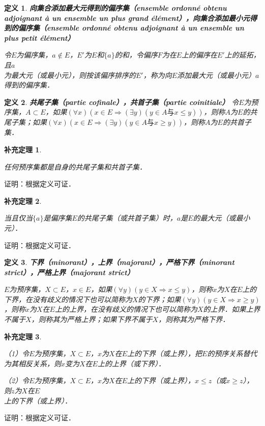 \documentclass[12pt, a4paper, oneside]{book}
\newtheorem{cor}{补充定理}
\newtheorem{de}{定义}
\begin{document}
			\begin{de}
				\textbf{向集合添加最大元得到的偏序集（ensemble ordonné obtenu adjoignant à un ensemble un plus grand élément），向集合添加最小元得到的偏序集（ensemble ordonné obtenu adjoignant à un ensemble un plus petit élément）}
				\hfill\par
				令$E$为偏序集，$a\notin E$，$E'$为$E$和$\{a\}$的和，令偏序$F$为在$E$上的偏序在$E'$上的延拓，且$a$\\为最大元（或最小元），则按该偏序排序的$E'$，称为向$E$添加最大元（或最小元）$a$得到的偏序集．
			\end{de}

			\begin{de}
				\textbf{共尾子集（partie cofinale），共首子集（partie coinitiale）}
				令$E$为预序集，$A\subset E$，如果$(\forall x)(x\in E\Rightarrow (\exists y)(y\in A\text{与}x\leq y))$，则称$A$为$E$的共尾子集；如果$(\forall x)(x\in E\Rightarrow (\exists y)(y\in A\text{与}x\geq y))$，则称$A$为$E$的共首子集．
			\end{de}

			\begin{cor}\label{cor174}
				\hfill\par
				任何预序集都是自身的共尾子集和共首子集．
			\end{cor}
			证明：根据定义可证．
			
			\begin{cor}\label{cor175}
				\hfill\par
				当且仅当$\{a\}$是偏序集$E$的共尾子集（或共首子集）时，$a$是$E$的最大元（或最小元）．
			\end{cor}
			证明：根据定义可证．

			\begin{de}
				\textbf{下界（minorant），上界（majorant），严格下界（minorant strict），严格上界（majorant strict）}
				\par
				$E$为预序集，$X\subset E$，$x\in E$，如果$(\forall y)(y\in X\Rightarrow x\leq y)$，则称$x$为$X$在$E$上的下界，在没有歧义的情况下也可以简称为$X$的下界；如果$(\forall y)(y\in X\Rightarrow x\geq y)$，则称$x$为$X$在$E$上的上界，在没有歧义的情况下也可以简称为$X$的上界．如果上界不属于$X$，则称其为严格上界；如果下界不属于$X$，则称其为严格下界．			
			\end{de}
			
			\begin{cor}\label{cor176}
				\hfill\par
				（1）令$E$为预序集，$X\subset E$，$x$为$X$在$E$上的下界（或上界），把$E$的预序关系替代为其相反关系，则$x$变为$X$在$E$上的上界（或下界）．
				\par
				（2）令$E$为预序集，$X\subset E$，$x$为$X$在$E$上的下界（或上界），$x\leq z$（或$x\geq z$），则$z$为$X$在$E$\\上的下界（或上界）．
				\par
			\end{cor}
			证明：根据定义可证．
\end{document}
